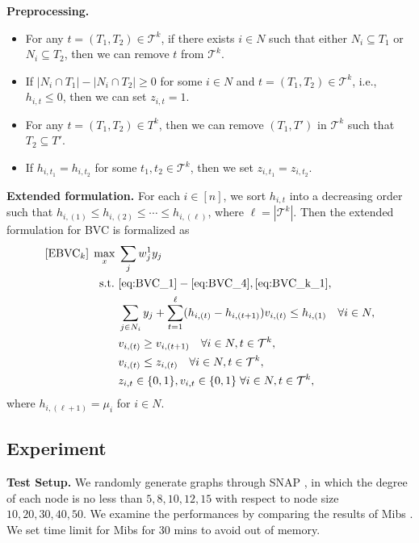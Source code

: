 \documentclass[11pt]{article}
\newcommand{\T}{\mathcal{T}}
\begin{document}
\noindent\textbf{Preprocessing.}
\begin{itemize}
	\item For any $t=(T_1, T_2) \in \T^k$, if there exists $i \in N$ such that either $N_i \subseteq T_1$ or $N_i \subseteq T_2$, then we can remove $t$ from $\T^k.$
	\item If $|N_i \cap T_1| - |N_i \cap T_2| \geq 0$ for some $i\in N$ and $t = (T_1, T_2)\in \T^k$, i.e., $h_{i, t} \leq 0$, then we can set $z_{i, t} = 1$.
	\item For any $t = (T_1, T_2) \in T^k$, then we can remove  $(T_1, T')$ in $\T^k$ such that $T_2 \subseteq T'$.
	\item If $h_{i, t_1} = h_{i, t_2}$ for some $t_1, t_2 \in \T^k$, then we set $z_{i, t_1} = z_{i, t_2}$.
\end{itemize}

\noindent \textbf{Extended formulation.} For each $i\in [n]$, we sort $h_{i, t}$ into a decreasing order such that $h_{i, (1)} \leq h_{i, (2)} \leq \cdots \leq h_{i, (\ell)}$, where $\ell = |\T^k|$. Then the extended formulation for BVC is formalized as
\begin{subequations}
	\begin{align}
	[\text{EBVC}_k]\;\max_x\; & \sum_j w_j^1 y_j \nonumber\\
	\text{s.t.~} & \eqref{eq:BVC_1} - \eqref{eq:BVC_4}, \eqref{eq:BVC_k_1}, \nonumber\\
	& \sum_{j\in N_i} y_j + \sum_{t=1}^\ell (h_{i, (t)} - h_{i, (t+1)}) v_{i, (t)} \leq h_{i, (1)} \quad \forall i\in N, \\
	& v_{i, (t)} \geq v_{i, (t+1)} \quad \forall i\in N, t\in \T^k, \\
	& v_{i, (t)} \leq z_{i, (t)} \quad \forall i\in N, t\in \T^k,\\ 
	&  z_{i, t} \in \{0, 1\}, v_{i, t}\in \{0, 1\} \;\forall i\in N, t\in \T^k, \nonumber
	\end{align}
\end{subequations}
where $h_{i, (\ell+1)} = \mu_i$ for $i\in N$.

\subsection{Experiment}
\textbf{Test Setup.} We randomly generate graphs through SNAP \cite{leskovec2016snap}, in which the degree of each node is no less than $5, 8, 10, 12, 15$ with respect to node size $10, 20, 30, 40, 50.$  We examine the performances by comparing the results of Mibs \cite{denegre2011interdiction}. We set time limit for Mibs for 30 mins to avoid out of memory.
\end{document}
